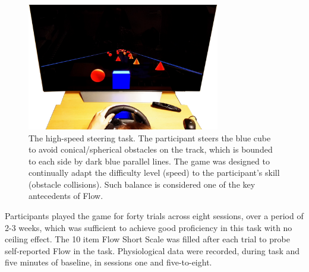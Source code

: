 \documentclass[a4paper,doc,floatsintext,natbib,10pt]{apa6}
\newcommand{\nicewidth}{0.75\textwidth}
\begin{document}
\begin{figure}[!ht]
	\centering
	\includegraphics[width=\nicewidth]{Screenshot_cogcarsim}
	\caption{The high-speed steering task. The participant steers the blue cube to avoid conical/spherical obstacles on the track, which is bounded to each side by dark blue parallel lines. The game was designed to continually adapt the difficulty level (speed) to the participant's skill (obstacle collisions). Such balance is considered one of the key antecedents of Flow.}
	\label{fig:cogcarsim}
\end{figure}

Participants played the game for forty trials across eight sessions, over a period of 2-3 weeks, which was sufficient to achieve good proficiency in this task with no ceiling effect. The 10 item Flow Short Scale \citep{Engeser2008} was filled after each trial to probe self-reported Flow in the task. Physiological data were recorded, during task and five minutes of baseline, in sessions one and five-to-eight.
\end{document}
